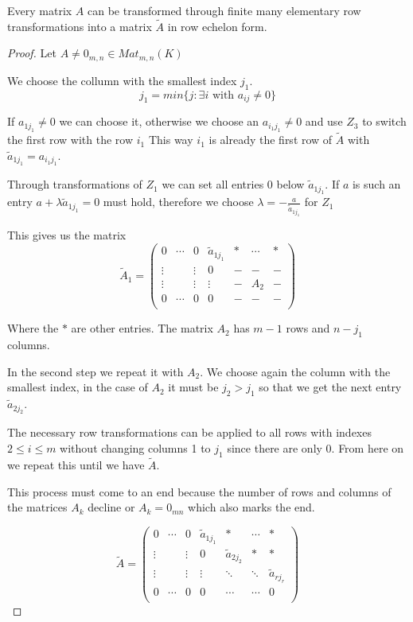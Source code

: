 \begin{theorem}
   Every matrix \(A\) can be transformed through finite many elementary row transformations into a matrix \(\tilde{A}\) in row echelon form.
\end{theorem}
\begin{proof}
   Let \(A \neq 0_{m,n} \in Mat_{m,n}(K)\)

   We choose the collumn with the smallest index \(j_1\).
   \[j_1 = min\{j: \exists i \text{ with } a_{ij} \neq 0\}\]

   If \(a_{1j_1} \neq 0\) we can choose it, otherwise we choose an \(a_{i_1j_1} \neq 0\) and use \(Z_3\) to switch the first row with the row \(i_1\)
   This way \(i_1\) is already the first row of \(\tilde{A}\) with \(\tilde{a}_{1j_1} = a_{i_1j_1}\).

   Through transformations of \(Z_1\) we can set all entries 0 below \(\tilde{a}_{1j_1}\).
   If \(a\) is such an entry \(a + \lambda \tilde{a}_{1j_1} = 0\) must hold, therefore we choose \(\lambda = -\frac{a}{\tilde{a}_{1j_1}}\) for \(Z_1\)

   This gives us the matrix
   \[\tilde{A}_1 = \begin{pmatrix}
      0 & \cdots & 0 & \tilde{a}_{1j_1} & * & \cdots & * \\
      \vdots &   & \vdots & 0 & - & - & - \\
      \vdots &   & \vdots & \vdots & - & A_2 & - \\
      0 & \cdots & 0 & 0 & - & - & - \\
   \end{pmatrix}\]

   Where the \(*\) are other entries.
   The matrix \(A_2\) has \(m - 1\) rows and \(n - j_1\) columns.

   In the second step we repeat it with \(A_2\).
   We choose again the column with the smallest index, in the case of \(A_2\) it must be \(j_2 > j_1\) so that we get the next entry \(\tilde{a}_{2j_2}\).

   The necessary row transformations can be applied to all rows with indexes \(2 \leq i \leq m\) without changing columns 1 to \(j_1\) since there are only 0.
   From here on we repeat this until we have \(\tilde{A}\).

   This process must come to an end because the number of rows and columns of the matrices \(A_k\) decline or \(A_k = 0_{mn}\) which also marks the end.

   \[\tilde{A} = \begin{pmatrix}
      0 & \cdots & 0 & \tilde{a}_{1j_1} & * & \cdots & * \\
      \vdots &   & \vdots & 0 & \tilde{a}_{2j_2} & * & * \\
      \vdots &   & \vdots & \vdots & \ddots & \ddots & \tilde{a}_{rj_r} \\
      0 & \cdots & 0 & 0 & \cdots & \cdots & 0 \\
   \end{pmatrix}\]
\end{proof}
